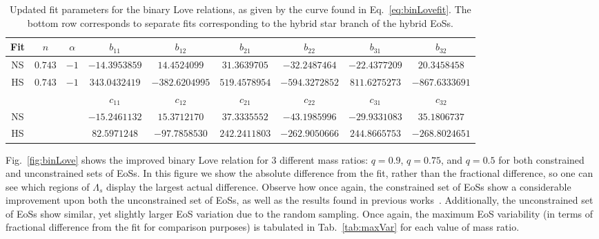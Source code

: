 \documentclass[prd,twocolumn,nofootinbib,superscriptaddress,amsmath,amssymb]{revtex4-1}
\begin{document}
\begin{table*}
\centering
\caption{
Updated fit parameters for the binary Love relations, as given by the curve found in Eq.~\ref{eq:binLovefit}.
The bottom row corresponds to separate fits corresponding to the hybrid star branch of the hybrid EoSs.
}\label{tab:binLovefit}
\addtolength{\tabcolsep}{1pt} 
\begin{tabular}{c | c  c  c  c  c  c  c  c } 
 \hline
 \hline
 Fit & $n$ & $\alpha$ & $b_{11}$ & $b_{12}$ & $b_{21}$ & $b_{22}$ & $b_{31}$ & $b_{32}$\\
 \hline
 NS & $0.743$ & $-1$ & $-14.3953859$ & $14.4524099$ & $31.3639705$ & $-32.2487464$ & $-22.4377209$ & $20.3458458$\\
 HS & $0.743$ & $-1$ & $343.0432419$ & $-382.6204995$ & $519.4578954$ & $-594.3272852$ & $811.6275273$ & $-867.6333691$\\
\hline
 \hline
 \noalign{\smallskip}

 & & & $c_{11}$ & $c_{12}$ & $c_{21}$ & $c_{22}$ & $c_{31}$ & $c_{32}$\\
 \hline
 NS & & & $-15.2461132$ & $15.3712170$ & $37.3335552$ & $-43.1985996$ & $-29.9331083$ & $35.1806737$\\
 HS & & & $82.5971248$ & $-97.7858530$ & $242.2411803$ & $-262.9050666$ & $244.8665753$ & $-268.8024651$\\
 \hline
 \hline
\end{tabular}
\addtolength{\tabcolsep}{-1pt}
\end{table*}

{}

Fig.~\ref{fig:binLove} shows the improved binary Love relation for 3 different mass ratios: $q=0.9$, $q=0.75$, and $q=0.5$ for both constrained and unconstrained sets of EoSs.
In this figure we show the absolute difference from the fit, rather than the fractional difference, so one can see which regions of $\Lambda_s$ display the largest actual difference.
Observe how once again, the constrained set of EoSs show a considerable improvement upon both the unconstrained set of EoSs, as well as the results found in previous works~\cite{Yagi:binLove}.
Additionally, the unconstrained set of EoSs show similar, yet slightly larger EoS variation due to the random sampling.
Once again, the maximum EoS variability (in terms of fractional difference from the fit for comparison purposes) is tabulated in Tab.~\ref{tab:maxVar} for each value of mass ratio.
\end{document}
